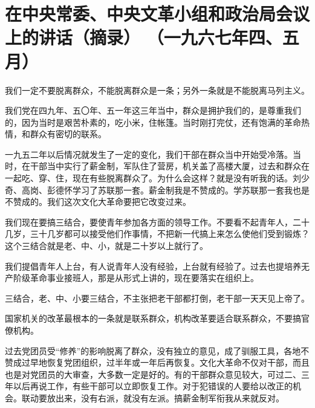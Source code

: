 \section[在中央常委、中央文革小组和政治局会议上的讲话（摘录） （一九六七年四、五月）]{在中央常委、中央文革小组和政治局会议上的讲话（摘录） （一九六七年四、五月）}


我们一定不要脱离群众，不能脱离群众是一条；另外一条就是不能脱离马列主义。

我们党在四九年、五〇年、五一年这三年当中，群众是拥护我们的，是尊重我们的，因为当时是艰苦朴素的，吃小米，住帐篷。当时刚打完仗，还有饱满的革命热情，和群众有密切的联系。

一九五二年以后情况就发生了一定的变化，我们干部在群众当中开始受冷落。当时，在干部当中实行了薪金制，军队住了营房，机关盖了高楼大厦，过去和群众在一起吃、穿、住，现在有些脱离群众了。为什么会这样？就是没有听我的话。刘少奇、高岗、彭德怀学习了苏联那一套。薪金制我是不赞成的。学苏联那一套我也是不赞成的。我们这次文化大革命要把它改变过来。

我们现在要搞三结合，要使青年参加各方面的领导工作。不要看不起青年人，二十几岁，三十几岁都可以接受他们作事情，不把新一代搞上来怎么使他们受到锻炼？这个三结合就是老、中、小，就是二十岁以上就行了。

我们提倡青年人上台，有人说青年人没有经验，上台就有经验了。过去也提培养无产阶级革命事业接班人，那是从形式上讲的，现在要落实在组织上。

三结合，老、中、小要三结合，不主张把老干部都打倒，老干部一天天见上帝了。

国家机关的改革最根本的一条就是联系群众，机构改革要适合联系群众，不要搞官僚机构。

过去党团员受“修养”的影响脱离了群众，没有独立的意见，成了驯服工具，各地不赞成过早地恢复党团组织，过半年或一年后再恢复。文化大革命不仅对干部，而且也是对党团员的大审查，大多数一定是好的。有的干部群众意见较大，可过二、三年以后再说工作，有些干部可以立即恢复工作。对于犯错误的人要给以改正的机会。联动要放出来，没有右派，就没有左派。搞薪金制军衔我从来就反对。


